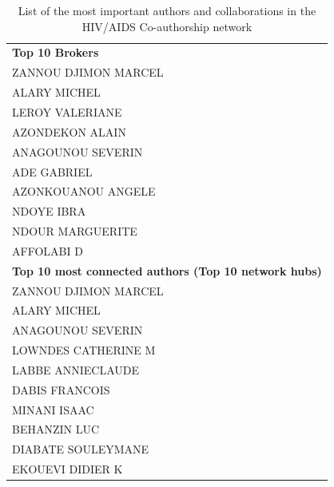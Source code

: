\begin{table}[h!]
\caption{List of the most important authors and collaborations in the HIV/AIDS Co-authorship network}
\label{table: hiv_list}
\centering \footnotesize
\begin{tabular}{l}
  \toprule
\textbf{Top 10 Brokers}\\
\hspace{20pt}ZANNOU DJIMON MARCEL\\
\hspace{20pt}ALARY MICHEL\\
\hspace{20pt}LEROY VALERIANE\\
\hspace{20pt}AZONDEKON ALAIN\\
\hspace{20pt}ANAGOUNOU SEVERIN\\
\hspace{20pt}ADE GABRIEL\\
\hspace{20pt}AZONKOUANOU ANGELE\\
\hspace{20pt}NDOYE IBRA\\
\hspace{20pt}NDOUR MARGUERITE\\
\hspace{20pt}AFFOLABI D\\
\hline
\textbf{Top 10 most connected authors (Top 10 network hubs)}\\
\hspace{20pt}ZANNOU DJIMON MARCEL\\
\hspace{20pt}ALARY MICHEL\\
\hspace{20pt}ANAGOUNOU SEVERIN\\
\hspace{20pt}LOWNDES CATHERINE M\\
\hspace{20pt}LABBE ANNIECLAUDE\\
\hspace{20pt}DABIS FRANCOIS\\
\hspace{20pt}MINANI ISAAC\\
\hspace{20pt}BEHANZIN LUC\\
\hspace{20pt}DIABATE SOULEYMANE\\
\hspace{20pt}EKOUEVI DIDIER K\\

\end{tabular}
\end{table}
